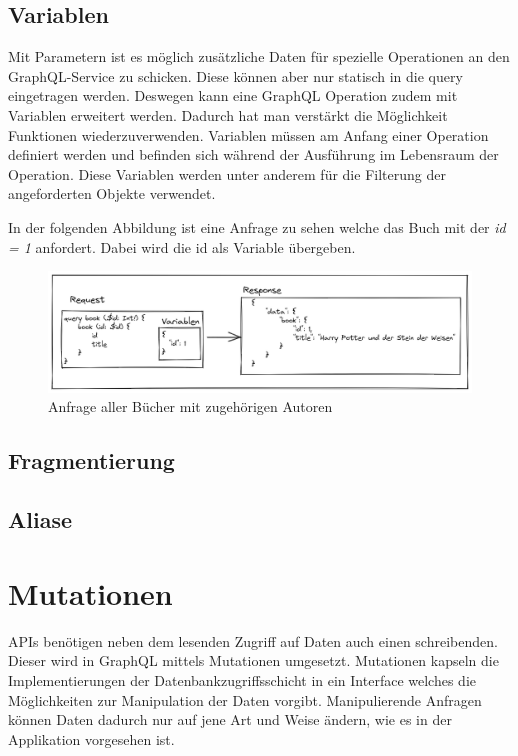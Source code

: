 \subsection{Variablen}
Mit Parametern ist es möglich zusätzliche Daten für spezielle Operationen an den GraphQL-Service zu schicken.
Diese können aber nur statisch in die query eingetragen werden.
Deswegen kann eine GraphQL Operation zudem mit Variablen erweitert werden.
Dadurch hat man verstärkt die Möglichkeit Funktionen wiederzuverwenden.
Variablen müssen am Anfang einer Operation definiert werden und befinden sich während der Ausführung im Lebensraum der Operation.
Diese Variablen werden unter anderem für die Filterung der angeforderten Objekte verwendet.
\newline

In der folgenden Abbildung ist eine Anfrage zu sehen welche das Buch mit der \textit{id = 1} anfordert. Dabei wird die id als Variable übergeben.

\begin{figure}[H]
    \includegraphics[width=\textwidth]{pics/book_request_with_parameter.png}
    \caption{Anfrage aller Bücher mit zugehörigen Autoren}
\end{figure}

\subsection{Fragmentierung}

\subsection{Aliase}

\section{Mutationen}
APIs benötigen neben dem lesenden Zugriff auf Daten auch einen schreibenden.
Dieser wird in GraphQL mittels Mutationen umgesetzt.
Mutationen kapseln die Implementierungen der Datenbankzugriffsschicht in ein Interface welches die Möglichkeiten zur Manipulation der Daten vorgibt.
Manipulierende Anfragen können Daten dadurch nur auf jene Art und Weise ändern, wie es in der Applikation vorgesehen ist.

